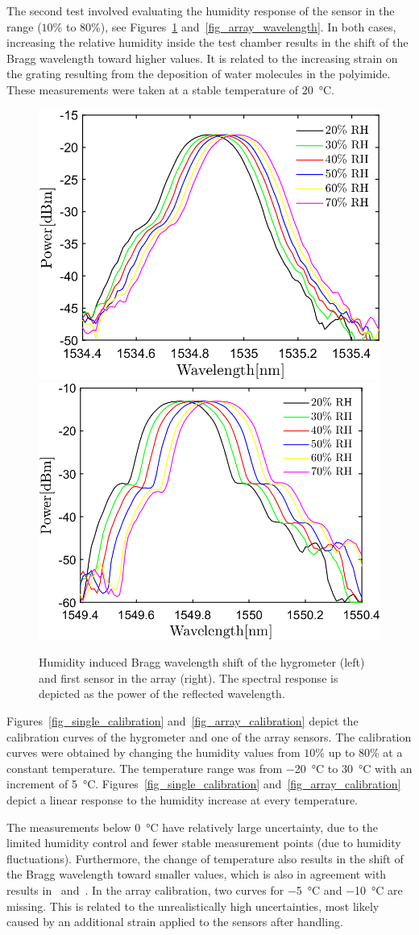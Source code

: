 The second test involved evaluating the humidity response of the sensor in the range ($10$\% to $80$\%), see Figures~\ref{fig_response} and~\ref{fig_array_wavelength}. In both cases, increasing the relative humidity inside the test chamber results in the shift of the Bragg wavelength toward higher values. It is related to the increasing strain on the grating resulting from the deposition of water molecules in the polyimide. These measurements were taken at a stable temperature of \SI{20}{\celsius}.
\begin{figure}[!h]
\centering
\includegraphics[width=0.45\columnwidth]{Chapter5/images/rh.png}
\includegraphics[width=0.475\columnwidth]{Chapter5/images/rh_array2.png}
\caption{Humidity induced Bragg wavelength shift of the hygrometer (left) and first sensor in the array (right). The spectral response is depicted as the power of the reflected wavelength. }
\label{fig_response}
\end{figure}
Figures~\ref{fig_single_calibration} and~\ref{fig_array_calibration} depict the calibration curves of the hygrometer and one of the array sensors. The calibration curves were obtained by changing the humidity values from $10$\% up to $80$\% at a constant temperature. The temperature range was from \SI{-20}{\celsius} to \SI{30}{\celsius} with an increment of \SI{5}{\celsius}. Figures~\ref{fig_single_calibration} and~\ref{fig_array_calibration} depict a linear response to the humidity increase at every temperature.

The measurements below \SI{0}{\celsius} have relatively large uncertainty, due to the limited humidity control and fewer stable measurement points (due to humidity fluctuations). Furthermore, the change of temperature also results in the shift of the Bragg wavelength toward smaller values, which is also in agreement with results in~\cite{Kronenberg:02} and~\cite{Berruti}. In the array calibration, two curves for \SI{-5}{\celsius} and \SI{-10}{\celsius} are missing. This is related to the unrealistically high uncertainties, most likely caused by an additional strain applied to the sensors after handling. %


